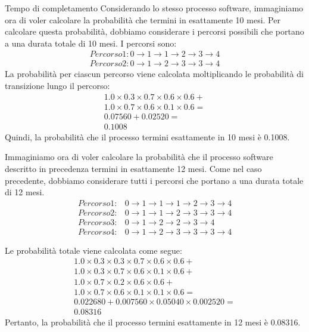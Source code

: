 \begin{Example}{Tempo di completamento}{}
Considerando lo stesso processo software, immaginiamo ora di voler calcolare la probabilità che termini in esattamente 10 mesi. Per calcolare questa probabilità, dobbiamo considerare i percorsi possibili che portano a una durata totale di 10 mesi. I percorsi sono:
\begin{gather*}
Percorso 1: 0\to 1\to 1\to 2\to 3\to 4\\
Percorso 2: 0\to 1\to 2\to 3\to 3\to 4
\end{gather*}
La probabilità per ciascun percorso viene calcolata moltiplicando le probabilità di transizione lungo il percorso:
\begin{align*}
    1.0 \times 0.3 \times 0.7 \times 0.6 \times 0.6 +\\ 1.0 \times 0.7 \times 0.6 \times 0.1 \times 0.6 =\\ 0.07560 + 0.02520 =\\ 0.1008
\end{align*}
Quindi, la probabilità che il processo termini esattamente in 10 mesi è 0.1008.

Immaginiamo ora di voler calcolare la probabilità che il processo software descritto in precedenza termini in esattamente 12 mesi. Come nel caso precedente, dobbiamo considerare tutti i percorsi che portano a una durata totale di 12 mesi.
\begin{align*}
Percorso 1: & 0\to 1\to 1\to 1\to 2\to 3\to 4\\
Percorso 2: & 0\to 1\to 1\to 2\to 3\to 3\to 4\\
Percorso 3: & 0\to 1\to 2\to 2\to 3\to 4\\
Percorso 4: & 0\to 1\to 2\to 3\to 3\to 3\to 4    
\end{align*}

Le probabilità totale viene calcolata come segue:
\begin{align*}
    1.0 \times 0.3 \times 0.3 \times 0.7 \times 0.6 \times 0.6 +\\ 1.0 \times 0.3 \times 0.7 \times 0.6 \times 0.1 \times 0.6 +\\ 1.0 \times 0.7 \times 0.2 \times 0.6 \times 0.6 + 
    \\1.0 \times 0.7 \times 0.6 \times 0.1 \times 0.1 \times 0.6 =\\ 0.022680 + 0.007560 \times 0.05040 \times 0.002520 =\\ 0.08316
\end{align*}
Pertanto, la probabilità che il processo termini esattamente in 12 mesi è 0.08316.
\end{Example}

